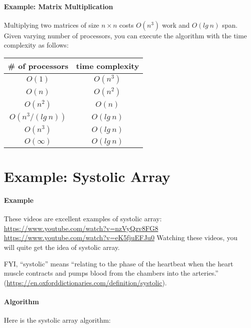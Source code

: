 \documentclass[11pt,a4paper,oneside,microtype,chapter,nokorean]{oblivoir}
\begin{document}
\paragraph{Example: Matrix Multiplication}

Multiplying two matrices of size $n \times n$ costs $O(n^3)$ work and $O(lg~n)$ span.  Given varying
number of processors, you can execute the algorithm with the time complexity as follows:

\begin{center}
\begin{tabular}{ c | c }
 \# of processors & time complexity \\
  \hline
 $O(1)$ & $O(n^3)$ \\
 $O(n)$ & $O(n^2)$ \\
 $O(n^2)$ & $O(n)$ \\
 $O(n^3 / (lg~n))$ & $O(lg~n)$ \\
 $O(n^3)$ & $O(lg~n)$ \\
 $O(\infty)$ & $O(lg~n)$
\end{tabular}
\end{center}



\section{Example: Systolic Array}

\paragraph{Example}

These videos are excellent examples of systolic array:
\url{https://www.youtube.com/watch?v=nzVyQzv8FG8} \url{https://www.youtube.com/watch?v=eK5fjuEFJu0}
Watching these videos, you will quite get the idea of systolic array.

FYI, ``systolic'' means ``relating to the phase of the heartbeat when the heart muscle contracts and
pumps blood from the chambers into the arteries.''
(\url{https://en.oxforddictionaries.com/definition/systolic}).


\paragraph{Algorithm}

Here is the systolic array algorithm:
\end{document}

